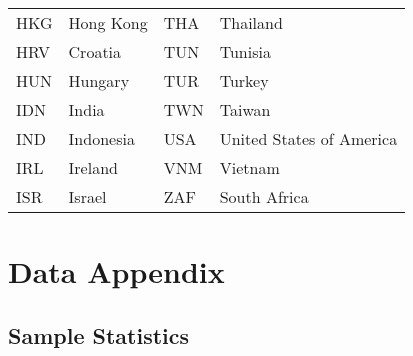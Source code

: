\begin{table}[H]
{\begin{longtable}{l*{1}{l}l*{1}{l}}
HKG             &     Hong Kong& THA             &     Thailand\\
HRV             &     Croatia& TUN             &     Tunisia\\
HUN             &     Hungary& TUR             &     Turkey\\
IDN             &     India& TWN             &     Taiwan\\
IND             &     Indonesia& USA             &    United States of America\\
IRL             &     Ireland& VNM             &     Vietnam\\
ISR             &     Israel& ZAF             &     South Africa\\ 
\bottomrule
\end{longtable}
}
\end{table}

\section{Data Appendix}
\subsection{Sample Statistics}

